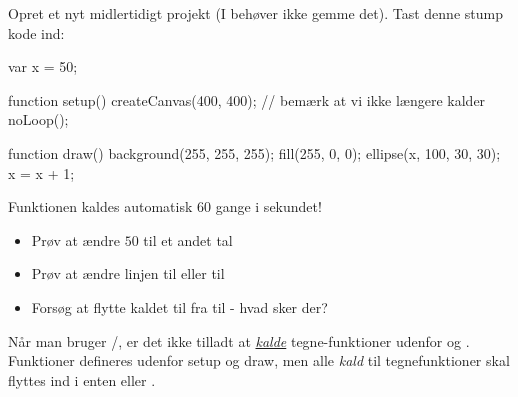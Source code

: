 \documentclass{ucph-handout}
\begin{document}
\begin{exercisebox}[adjusted title=Simpel animation]
Opret et nyt midlertidigt projekt (I behøver ikke gemme det). Tast
denne stump kode ind:

\begin{javascript}
var x = 50;

function setup() {
    createCanvas(400, 400);
    // bemærk at vi ikke længere kalder noLoop();
}

function draw() {
    background(255, 255, 255);
    fill(255, 0, 0);
    ellipse(x, 100, 30, 30);
    x = x + 1;
}

\end{javascript}

\noindent
Funktionen  kaldes automatisk 60 gange i sekundet!

\begin{itemize}
\item Prøv at ændre $50$ til et andet tal 
\item Prøv at ændre linjen  til  eller til 
\item Forsøg at flytte kaldet til  fra 
  til  - hvad sker der?
\end{itemize}

Når man bruger /, er det
ikke tilladt at \underline{\textit{kalde}} tegne-funktioner udenfor
 og . Funktioner defineres udenfor setup og
draw, men alle \textit{kald} til tegnefunktioner skal flyttes ind i
enten  eller .
\end{exercisebox}
\end{document}

